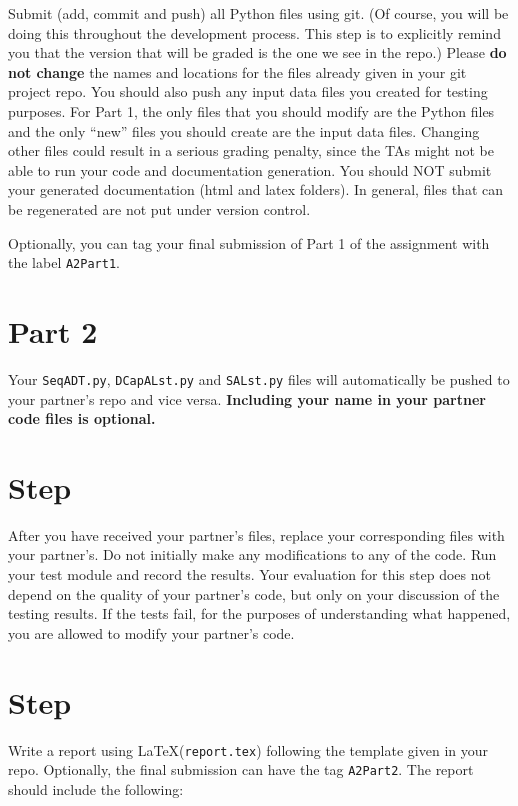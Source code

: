 \documentclass[12pt]{article}
\newcommand{\latex}{\LaTeX\xspace}
\newcounter{stepnum}
\begin{document}
Submit (add, commit and push) all Python files using git.  (Of course, you will
be doing this throughout the development process.  This step is to explicitly
remind you that the version that will be graded is the one we see in the repo.)
Please \textbf{do not change} the names and locations for the files already
given in your git project repo.  You should also push any input data files you
created for testing purposes.  For Part 1, the only files that you should modify
are the Python files and the only ``new'' files you should create are the input
data files.  Changing other files could result in a serious grading penalty,
since the TAs might not be able to run your code and documentation generation.
You should NOT submit your generated documentation (html and latex folders).  In
general, files that can be regenerated are not put under version control.

Optionally, you can tag your final submission of Part 1 of the assignment with
the label \texttt{A2Part1}.

\section*{Part 2}

Your {\tt SeqADT.py}, {\tt DCapALst.py} and {\tt SALst.py} files will
automatically be pushed to your partner's repo and vice versa.
\textbf{Including your name in your partner code files is optional.} 

\section *{Step  \thestepnum}

After you have received your partner's files, replace your corresponding files
with your partner's.  Do not initially make any modifications to any of the
code.  Run your test module and record the results.  Your evaluation for this
step does not depend on the quality of your partner's code, but only on your
discussion of the testing results.  If the tests fail, for the purposes of
understanding what happened, you are allowed to modify your partner's code.

\section *{Step  \thestepnum \label{StepReport}} 

Write a report using \latex (\texttt{report.tex}) following the template given
in your repo.  Optionally, the final submission can have the tag
\texttt{A2Part2}.  The report should include the following:
\end{document}
